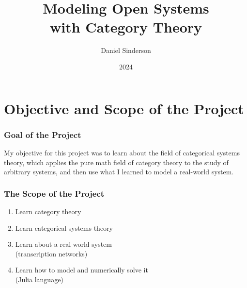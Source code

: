 \documentclass{beamer}
\title{Modeling Open Systems \\with Category Theory}
\author{Daniel Sinderson}
\institute{Southern Oregon University}
\date{2024}
\begin{document}
\frame{\titlepage}



\section{Objective and Scope of the Project}

\begin{frame}
    \frametitle{Goal of the Project}
    \begin{large}
        My objective for this project was to learn about the field of categorical systems theory,
        which applies the pure math field of category theory to the study of arbitrary systems,
        and then use what I learned to model a real-world system.
    \end{large}
\end{frame}

\begin{frame}
    \frametitle{The Scope of the Project}
    \begin{large}
        \begin{enumerate}
            \item Learn category theory
            \item Learn categorical systems theory
            \item Learn about a real world system
                  \\(transcription networks)
            \item Learn how to model and numerically solve it
                  \\(Julia language)
        \end{enumerate}
    \end{large}

\end{frame}
\end{document}
